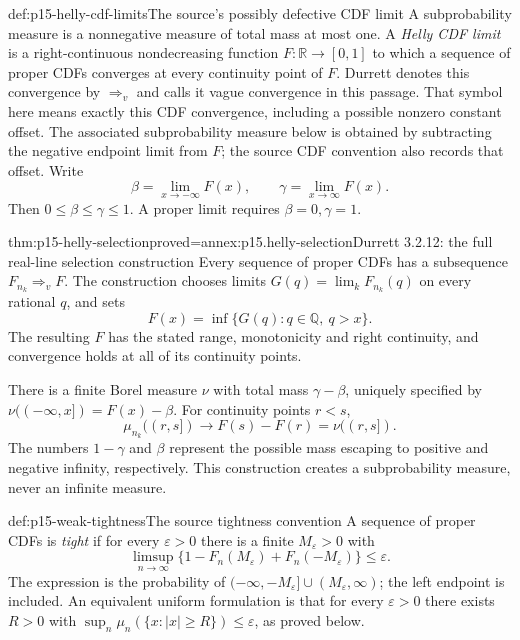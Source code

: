 \begin{hbdefinition}{def:p15-helly-cdf-limits}{The source's possibly defective CDF limit}
A subprobability measure is a nonnegative measure of total mass
at most one.
A \emph{Helly CDF limit} is a right-continuous nondecreasing
function \(F:\mathbb R\to[0,1]\) to which a sequence of proper
CDFs converges at every continuity point of \(F\).
Durrett denotes this convergence by \(\Rightarrow_v\) and calls
it vague convergence in this passage. That symbol here means
exactly this CDF convergence, including a possible nonzero
constant offset. The associated subprobability measure below
is obtained by subtracting the negative endpoint limit from
\(F\); the source CDF convention also records that offset.
Write
\[
 \beta=\lim_{x\to-\infty}F(x),\qquad
 \gamma=\lim_{x\to\infty}F(x).
\]
Then \(0\leq\beta\leq\gamma\leq1\). A proper limit requires
\(\beta=0,\gamma=1\).
\end{hbdefinition}

\begin{hbtheorem}{thm:p15-helly-selection}{proved=annex:p15.helly-selection}{Durrett 3.2.12: the full real-line selection construction}
Every sequence of proper CDFs has a subsequence
\(F_{n_k}\Rightarrow_v F\). The construction chooses limits
\(G(q)=\lim_kF_{n_k}(q)\) on every rational \(q\), and sets
\[
 F(x)=\inf\{G(q):q\in\mathbb Q,\ q>x\}.
\]
The resulting \(F\) has the stated range, monotonicity and right
continuity, and convergence holds at all of its continuity points.

There is a finite Borel measure \(\nu\) with total mass
\(\gamma-\beta\), uniquely specified by
\(\nu((-\infty,x])=F(x)-\beta\). For continuity points \(r<s\),
\[
 \mu_{n_k}((r,s])\longrightarrow F(s)-F(r)=\nu((r,s]).
\]
The numbers \(1-\gamma\) and \(\beta\) represent the possible
mass escaping to positive and negative infinity, respectively.
This construction creates a subprobability measure, never an
infinite measure.
\end{hbtheorem}

\begin{hbdefinition}{def:p15-weak-tightness}{The source tightness convention}
A sequence of proper CDFs is \emph{tight} if for every
\(\varepsilon>0\) there is a finite \(M_\varepsilon>0\) with
\[
 \limsup_{n\to\infty}
   \{1-F_n(M_\varepsilon)+F_n(-M_\varepsilon)\}
          \leq\varepsilon.
\]
The expression is the probability of
\((-\infty,-M_\varepsilon]\cup(M_\varepsilon,\infty)\);
the left endpoint is included. An equivalent uniform formulation
is that for every \(\varepsilon>0\) there exists \(R>0\) with
\(\sup_n\mu_n(\{x:|x|\geq R\})\leq\varepsilon\), as proved below.
\end{hbdefinition}

